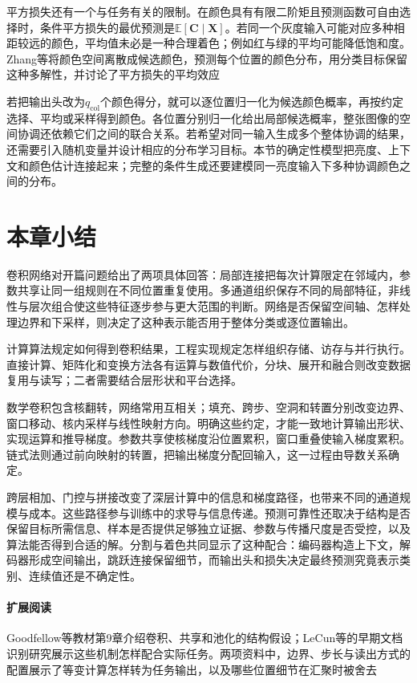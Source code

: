 平方损失还有一个与任务有关的限制。在颜色具有有限二阶矩且预测函数可自由选择时，条件平方损失的最优预测是$\mathbb E[\bm C\mid\bm X]$。若同一个灰度输入可能对应多种相距较远的颜色，平均值未必是一种合理着色；例如红与绿的平均可能降低饱和度。Zhang等将颜色空间离散成候选颜色，预测每个位置的颜色分布，用分类目标保留这种多解性，并讨论了平方损失的平均效应

若把输出头改为$q_{\mathrm{col}}$个颜色得分，就可以逐位置归一化为候选颜色概率，再按约定选择、平均或采样得到颜色。各位置分别归一化给出局部候选概率，整张图像的空间协调还依赖它们之间的联合关系。若希望对同一输入生成多个整体协调的结果，还需要引入随机变量并设计相应的分布学习目标。本节的确定性模型把亮度、上下文和颜色估计连接起来；完整的条件生成还要建模同一亮度输入下多种协调颜色之间的分布。

\section{本章小结}
\label{sec:cnn-summary}

卷积网络对开篇问题给出了两项具体回答：局部连接把每次计算限定在邻域内，参数共享让同一组规则在不同位置重复使用。多通道组织保存不同的局部特征，非线性与层次组合使这些特征逐步参与更大范围的判断。网络是否保留空间轴、怎样处理边界和下采样，则决定了这种表示能否用于整体分类或逐位置输出。

计算算法规定如何得到卷积结果，工程实现规定怎样组织存储、访存与并行执行。直接计算、矩阵化和变换方法各有运算与数值代价，分块、展开和融合则改变数据复用与读写；二者需要结合层形状和平台选择。

数学卷积包含核翻转，网络常用互相关；填充、跨步、空洞和转置分别改变边界、窗口移动、核内采样与线性映射方向。明确这些约定，才能一致地计算输出形状、实现运算和推导梯度。参数共享使核梯度沿位置累积，窗口重叠使输入梯度累积。链式法则通过前向映射的转置，把输出梯度分配回输入，这一过程由导数关系确定。

跨层相加、门控与拼接改变了深层计算中的信息和梯度路径，也带来不同的通道规模与成本。这些路径参与训练中的求导与信息传递。预测可靠性还取决于结构是否保留目标所需信息、样本是否提供足够独立证据、参数与传播尺度是否受控，以及算法能否得到合适的解。分割与着色共同显示了这种配合：编码器构造上下文，解码器形成空间输出，跳跃连接保留细节，而输出头和损失决定最终预测究竟表示类别、连续值还是不确定性。

\paragraph{扩展阅读}
Goodfellow等教材第9章介绍卷积、共享和池化的结构假设；LeCun等的早期文档识别研究展示这些机制怎样配合实际任务。两项资料中，边界、步长与读出方式的配置展示了等变计算怎样转为任务输出，以及哪些位置细节在汇聚时被舍去
